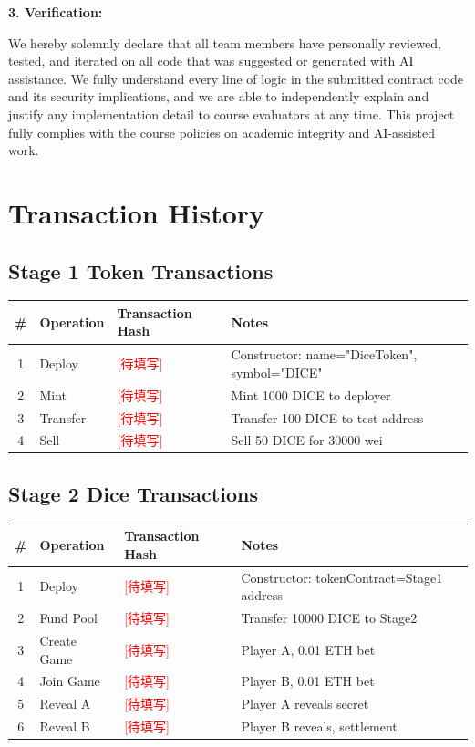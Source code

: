 \documentclass[10pt,a4paper]{article}
\begin{document}
\textbf{3. Verification:}

We hereby solemnly declare that all team members have personally reviewed, tested, and iterated on all code that was suggested or generated with AI assistance. We fully understand every line of logic in the submitted contract code and its security implications, and we are able to independently explain and justify any implementation detail to course evaluators at any time. This project fully complies with the course policies on academic integrity and AI-assisted work.

\section{Transaction History}

\subsection*{Stage 1 Token Transactions}

\begin{table}[h]
\centering
\begin{tabularx}{\textwidth}{c X X X}
\toprule
\textbf{\#} & \textbf{Operation} & \textbf{Transaction Hash} & \textbf{Notes} \\
\midrule
1 & Deploy & \textcolor{red}{[待填写]} & Constructor: name="DiceToken", symbol="DICE" \\
2 & Mint & \textcolor{red}{[待填写]} & Mint 1000 DICE to deployer \\
3 & Transfer & \textcolor{red}{[待填写]} & Transfer 100 DICE to test address \\
4 & Sell & \textcolor{red}{[待填写]} & Sell 50 DICE for 30000 wei \\
\bottomrule
\end{tabularx}
\end{table}

\subsection*{Stage 2 Dice Transactions}

\begin{table}[h]
\centering
\begin{tabularx}{\textwidth}{c X X X}
\toprule
\textbf{\#} & \textbf{Operation} & \textbf{Transaction Hash} & \textbf{Notes} \\
\midrule
1 & Deploy & \textcolor{red}{[待填写]} & Constructor: tokenContract=Stage1 address \\
2 & Fund Pool & \textcolor{red}{[待填写]} & Transfer 10000 DICE to Stage2 \\
3 & Create Game & \textcolor{red}{[待填写]} & Player A, 0.01 ETH bet \\
4 & Join Game & \textcolor{red}{[待填写]} & Player B, 0.01 ETH bet \\
5 & Reveal A & \textcolor{red}{[待填写]} & Player A reveals secret \\
6 & Reveal B & \textcolor{red}{[待填写]} & Player B reveals, settlement \\
\bottomrule
\end{tabularx}
\end{table}
\end{document}
